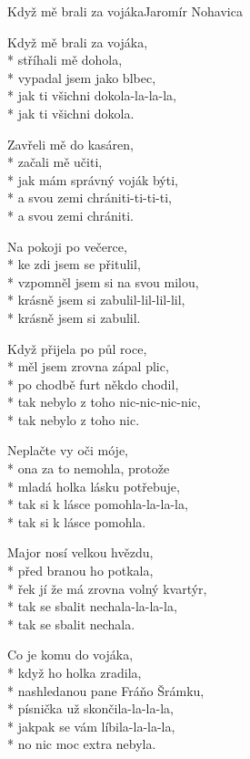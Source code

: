 \documentclass[10.5pt]{book}
\begin{document}
\begin{poem}{Když mě brali za vojáka}{Jaromír Nohavica}

\settowidth{\versewidth}{krásně jsem si zabulil-lil-lil-lil,}

Když mě brali za vojáka,\\*
stříhali mě dohola,\\*
vypadal jsem jako blbec,\\*
jak ti všichni dokola-la-la-la,\\*
jak ti všichni dokola.

Zavřeli mě do kasáren,\\*
začali mě učiti,\\*
jak mám správný voják býti,\\*
a svou zemi chrániti-ti-ti-ti,\\*
a svou zemi chrániti.

Na pokoji po večerce,\\*
ke zdi jsem se přitulil,\\*
vzpomněl jsem si na svou milou,\\*
krásně jsem si zabulil-lil-lil-lil,\\*
krásně jsem si zabulil.

Když přijela po půl roce,\\*
měl jsem zrovna zápal plic,\\*
po chodbě furt někdo chodil,\\*
tak nebylo z toho nic-nic-nic-nic,\\*
tak nebylo z toho nic.

Neplačte vy oči móje,\\*
ona za to nemohla, protože\\*
mladá holka lásku potřebuje,\\*
tak si k lásce pomohla-la-la-la,\\*
tak si k lásce pomohla.

Major nosí velkou hvězdu,\\*
před branou ho potkala,\\*
řek jí že má zrovna volný kvartýr,\\*
tak se sbalit nechala-la-la-la,\\*
tak se sbalit nechala.

Co je komu do vojáka,\\*
když ho holka zradila,\\*
nashledanou pane Fráňo Šrámku,\\*
písnička už skončila-la-la-la,\\*
jakpak se vám líbila-la-la-la,\\*
no nic moc extra nebyla.

\end{poem}
\end{document}
